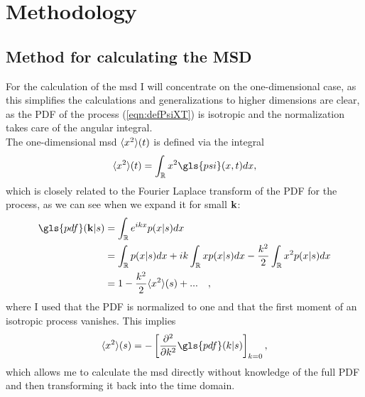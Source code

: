 \chapter{Methodology}



\section{Method for calculating the MSD} 

For the calculation of the \gls{msd} I will concentrate on the one-dimensional case, as this simplifies the calculations and generalizations to higher dimensions are clear, as the \gls{PDF} of the process (\ref{eqn:defPsiXT}) is isotropic and the normalization takes care of the angular integral. \\

The one-dimensional \gls{msd} $\langle x^2 \rangle(t)$ is defined via the integral 
%
\begin{align}
\mean{x^2}(t) = \int_{\mathbb{R}} x^2 \gls{psi}(x,t) dx ,
\end{align}
%
which is closely related to the Fourier Laplace transform of the \gls{PDF} for the process, as we can see when we expand it for small $\mathbf{ k }$:
%
\begin{align}
\gls{pdf}(\ve{k}|s) &= \int_{\mathbb{R}}  e^{ik x} p(x|s) dx  \\
&= \int_{\mathbb{R}}   p(x|s) dx +  i k \int_{\mathbb{R}}   x p(x|s) dx - \frac{k^2}{2} \int_{\mathbb{R}}   x^2 p(x|s) dx \\
&= 1 - \frac{k^2}{2} \mean{x^2}(s)  + ... \quad ,
\end{align}
%
where I used that the \gls{PDF} is normalized to one and that the first moment of an isotropic process vanishes. This implies 
%
\begin{align}
\mean{x^2}(s) = - \left[ \npder{}{k}{2} \gls{pdf}(k|s) \right]_{k=0},
\end{align}
%
which allows me to calculate the \gls{msd} directly without knowledge of the full \gls{PDF} and then transforming it back into the time domain.\\

